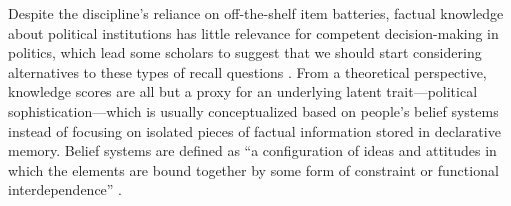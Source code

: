 

Despite the discipline's reliance on off-the-shelf item batteries, factual knowledge about political institutions has little relevance for competent decision-making in politics, which lead some scholars to suggest that we should start considering alternatives to these types of recall questions \citep{druckman2014pathologies}. From a theoretical perspective, knowledge scores are all but a proxy for an underlying latent trait---political sophistication---which is usually conceptualized based on people's belief systems instead of focusing on isolated pieces of factual information stored in declarative memory. Belief systems are defined as ``a configuration of ideas and attitudes in which the elements are bound together by some form of constraint or functional interdependence'' \citep[207]{converse1964nature}.

